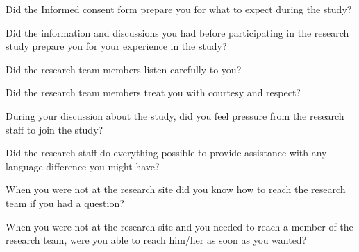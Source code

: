 \documentclass[english,pagemark,stamp,oneside,print_questionnaire_id]{sdapsclassic}
\begin{document}
\begin{questionnaire}
\begin{Form}
                        \begin{optionquestion}[singlechoice,cols=1]{Did the Informed consent form prepare you for what to expect during the study?}\end{optionquestion}
                        \begin{optionquestion}[singlechoice,cols=1]{Did the information and discussions you had before participating in the research study prepare you for your experience in the study?}\end{optionquestion}
                        \begin{optionquestion}[singlechoice,cols=1]{Did the research team members listen carefully to you?}\end{optionquestion}
                        \begin{optionquestion}[singlechoice,cols=1]{Did the research team members treat you with courtesy and respect?}\end{optionquestion}
                        \begin{optionquestion}[singlechoice,cols=1]{During your discussion about the study, did you feel pressure from the research staff to join the study?}\end{optionquestion}
                        \begin{optionquestion}[singlechoice,cols=1]{Did the research staff do everything possible to provide assistance with any language difference you might have?}\end{optionquestion}
                        \begin{optionquestion}[singlechoice,cols=1]{When you were not at the research site did you know how to reach the research team if you had a question?}\end{optionquestion}
                        \begin{optionquestion}[singlechoice,cols=1]{When you were not at the research site and you needed to reach a member of the research team, were you able to reach him/her as soon as you wanted?}\end{optionquestion}

\end{Form}
\end{questionnaire}
\end{document}
